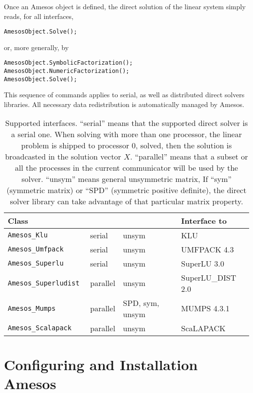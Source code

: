 \documentclass[11pt]{SANDreport}
\begin{document}
Once an Amesos object is defined, the direct solution of the linear
system simply reads, for all interfaces,
\begin{verbatim}
AmesosObject.Solve();
\end{verbatim}
or, more generally, by
\begin{verbatim}
AmesosObject.SymbolicFactorization();
AmesosObject.NumericFactorization();
AmesosObject.Solve();
\end{verbatim}
This sequence of commands applies to serial, as well as distributed
direct solvers libraries. All necessary data redistribution is
automatically managed by Amesos.

\begin{table}[tbhp]
  \centering
  \begin{tabular}{| l | l l l | }
    \hline
    Class &   &  & Interface to \\
    \hline
    \tt Amesos\_Klu          & serial & unsym & KLU \\
    \tt Amesos\_Umfpack      & serial & unsym & UMFPACK 4.3 \\
    \tt Amesos\_Superlu      & serial & unsym & SuperLU 3.0 \\
    \tt  Amesos\_Superludist  & parallel & unsym & SuperLU\_DIST 2.0 \\
    \tt Amesos\_Mumps        & parallel & SPD, sym, unsym & MUMPS 4.3.1 \\
    \tt Amesos\_Scalapack    & parallel & unsym & ScaLAPACK \\
    \hline
  \end{tabular}
  \caption{Supported interfaces. ``serial'' means that the supported
    direct solver is a serial one. When solving with 
    more than one processor, the linear problem is shipped to processor 0, 
    solved, then the solution is broadcasted in the solution vector 
    $X$. ``parallel'' means that a subset or all the processes in the current
    communicator will be used by the solver. ``unsym'' means general
    unsymmetric 
    matrix, If ``sym'' (symmetric matrix) or  ``SPD'' (symmetric
    positive definite), the direct solver library can take advantage of
    that particular matrix property.}
  \label{tab:classes}
\end{table}



\section{Configuring and Installation Amesos}
\label{sec:3pl}
\end{document}
